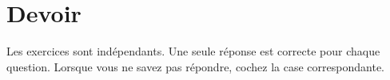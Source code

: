 \documentclass[11pt]{report}
\theoremstyle{definition}
\newtheorem{exo}{Exercice}[chapter]
\begin{document}


%
%

\chapter*{Devoir }

Les exercices sont indépendants. Une seule réponse est correcte pour chaque
question. Lorsque vous ne savez pas répondre, cochez la case correspondante.
\end{document}
